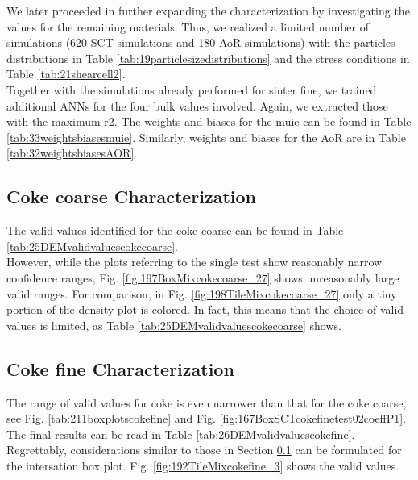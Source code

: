 We later proceeded in further expanding the characterization by investigating
the values for the remaining materials.
Thus, we realized a limited number of simulations (620 \acs{SCT} simulations
and 180 \acs{AoR} simulations) with the particles distributions in Table
\ref{tab:19particlesizedistributions} and the stress conditions in Table
\ref{tab:21shearcell2}.\\
Together with the simulations already performed for sinter fine, we trained
additional \acs{ANNs} for the four bulk values involved.
Again, we extracted those with the maximum \acs{r2}.
The weights and biases for the \acs{muie} can be found in Table
\ref{tab:33weightsbiasesmuie}.
Similarly, weights and biases for the \acs{AoR} are in Table
\ref{tab:32weightsbiasesAOR}.





\subsection{Coke coarse Characterization}
\label{subsec:cokecoarsecharacterization}

The valid values identified for the coke coarse can be found in Table
\ref{tab:25DEMvalidvaluescokecoarse}.\\
However, while the plots referring to the single test show reasonably narrow
confidence ranges, Fig. \ref{fig:197BoxMixcokecoarse_27} shows unreasonably
large valid ranges.
For comparison, in Fig. \ref{fig:198TileMixcokecoarse_27} only a tiny portion of
the density plot is colored.
In fact, this means that the choice of valid values is limited, as Table
\ref{tab:25DEMvalidvaluescokecoarse} shows.


%


\subsection{Coke fine Characterization}
\label{subsec:cokefinecharacterization}

The range of valid values for coke is even narrower than that for the coke
coarse, see Fig. \ref{tab:211boxplotscokefine} and
Fig. \ref{fig:167BoxSCTcokefinetest02coeffP1}.
The final results can be read in Table \ref{tab:26DEMvalidvaluescokefine}.\\
Regrettably, considerations similar to those in Section
\ref{subsec:cokecoarsecharacterization} can be formulated for the intersation
box plot.
Fig. \ref{fig:192TileMixcokefine_3} shows the valid values.

